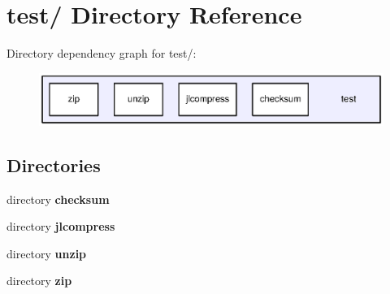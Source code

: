\section{test/ Directory Reference}
\label{dir_b796931cc32a3d469bbbc73c188df391}
Directory dependency graph for test/:
\nopagebreak
\begin{figure}[H]
\begin{center}
\leavevmode
\includegraphics[width=400pt]{dir_b796931cc32a3d469bbbc73c188df391_dep}
\end{center}
\end{figure}
\subsection*{Directories}
\begin{DoxyCompactItemize}
\item 
directory {\bf checksum}
\item 
directory {\bf jlcompress}
\item 
directory {\bf unzip}
\item 
directory {\bf zip}
\end{DoxyCompactItemize}
